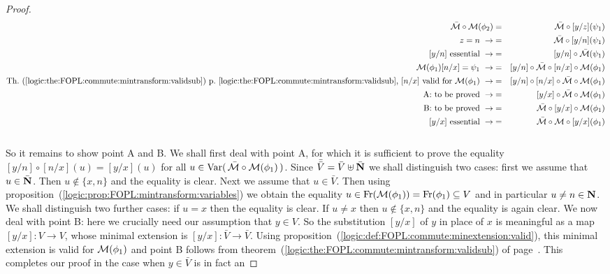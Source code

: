 \begin{proof}
    \begin{eqnarray*}
    \bar{\cal M}\circ{\cal M}(\phi_{2})&=&\bar{\cal
    M}\circ[y/z](\psi_{1})\\
    z=n\ \rightarrow&=&\bar{\cal M}\circ[y/n](\psi_{1})\\
    \mbox{$[y/n]$ essential}\ \rightarrow
    &=&[y/n]\circ\bar{\cal M}(\psi_{1})\\
    {\cal M}(\phi_{1})[n/x]=\psi_{1}\ \rightarrow
    &=&[y/n]\circ\bar{\cal M}\circ[n/x]\circ{\cal M}(\phi_{1})\\
    \mbox{Th.~(\ref{logic:the:FOPL:commute:mintransform:validsub})
    p.~\pageref{logic:the:FOPL:commute:mintransform:validsub}, $[n/x]$ valid for ${\cal M}(\phi_{1})$}
    \ \rightarrow&=&[y/n]\circ[n/x]\circ\bar{\cal M}\circ{\cal M}(\phi_{1})\\
    \mbox{A: to be proved}\ \rightarrow&=&[y/x]\circ\bar{\cal M}\circ{\cal M}(\phi_{1})\\
    \mbox{B: to be proved}\ \rightarrow&=&\bar{\cal M}\circ[y/x]\circ{\cal M}(\phi_{1})\\
    \mbox{$[y/x]$ essential}\ \rightarrow&=&\bar{\cal M}\circ{\cal M}\circ[y/x](\phi_{1})\\\
    \end{eqnarray*}
So it remains to show point A and B. We shall first deal with point
A, for which it is sufficient to prove the equality
$[y/n]\circ[n/x](u)=[y/x](u)$ for all $u\in\mbox{\rm Var}(\,\bar{\cal
M}\circ{\cal M}(\phi_{1})\,)$. Since
$\bar{\bar{V}}=\bar{V}\uplus\bar{\mbox{$\bf N$}}$ we shall distinguish two
cases: first we assume that $u\in\bar{\mbox{$\bf N$}}$. Then $u\not\in\{x,n\}$
and the equality is clear. Next we assume that $u\in\bar{V}$. Then
using proposition~(\ref{logic:prop:FOPL:mintransform:variables}) we
obtain the equality $u\in\mbox{\rm Fr}({\cal
M}(\phi_{1}))=\mbox{\rm Fr}(\phi_{1})\subseteq V$ and in particular $u\neq
n\in\mbox{$\bf N$}$. We shall distinguish two further cases: if $u=x$ then the
equality is clear. If $u\neq x$ then $u\not\in\{x,n\}$ and the
equality is again clear. We now deal with point B: here we crucially
need our assumption that $y\in V$. So  the substitution $[y/x]$ of
$y$ in place of $x$ is meaningful as a map $[y/x]:V\to V$, whose
minimal extension is $[y/x]:\bar{V}\to\bar{V}$. Using
proposition~(\ref{logic:def:FOPL:commute:minextension:valid}), this
minimal extension is valid for ${\cal M}(\phi_{1})$ and point B
follows from
theorem~(\ref{logic:the:FOPL:commute:mintransform:validsub}) of
page~\pageref{logic:the:FOPL:commute:mintransform:validsub}. This
completes our proof in the case when $y\in\bar{V}$ is in fact an

\end{proof}
